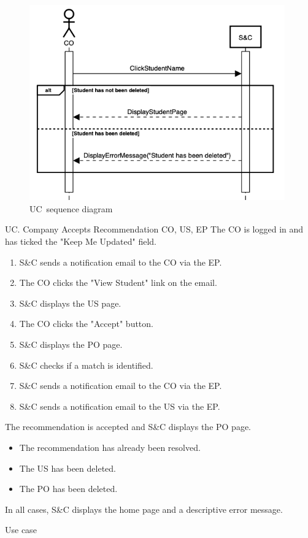 \begin{figure}[h]
    \centering
    \includegraphics[width=11cm]{images/sequence-diagrams/company-views-student.png}
    \caption{UC\theuc\ sequence diagram}
\end{figure}


\clearpage

\begin{usecase}
    {UC\theuc. Company Accepts Recommendation}
    {CO, US, EP}
    {The CO is logged in and has ticked the "Keep Me Updated" field.}
    {\begin{enumerate}[leftmargin=*]
        \item S\&C sends a notification email to the CO via the EP.
        \item The CO clicks the "View Student" link on the email.
        \item S\&C displays the US page.
        \item The CO clicks the "Accept" button.
        \item S\&C displays the PO page.
        \item S\&C checks if a match is identified.
        \item S\&C sends a notification email to the CO via the EP.
        \item S\&C sends a notification email to the US via the EP.
    \end{enumerate}}
    {The recommendation is accepted and S\&C displays the PO page.}
    {\begin{itemize}[leftmargin=*, label=\tiny\textbullet]
        \item The recommendation has already been resolved.
        \item The US has been deleted.
        \item The PO has been deleted.
    \end{itemize}
    In all cases, S\&C displays the home page and a descriptive error message.}
    {Use case \theuc}
\end{usecase}

